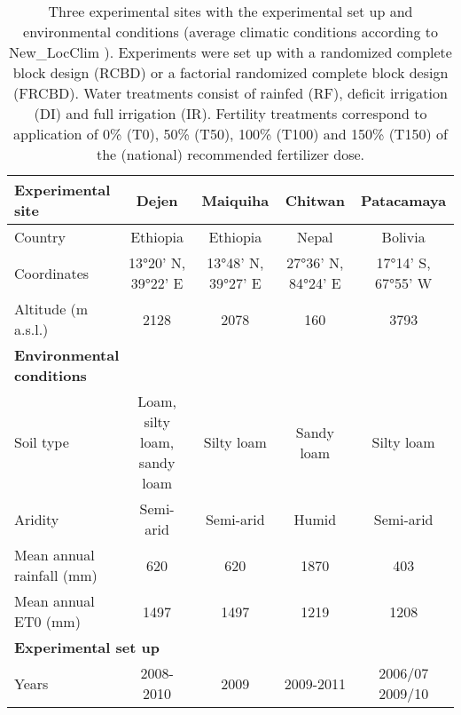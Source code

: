 \begin{landscape}
\begin{table}[htbp]
  	\caption{Three experimental sites with the experimental set up and environmental conditions (average climatic 	conditions according to New\_LocClim \parencite{fao2005}). Experiments were set up with a randomized complete block design (RCBD) or a factorial randomized complete block design (FRCBD). Water treatments consist of rainfed (RF), deficit irrigation (DI) and full irrigation (IR). Fertility treatments correspond to application of 0\% (T0), 50\% (T50), 100\% (T100) and 150\% (T150) of the (national) recommended fertilizer dose.}
    \resizebox{\linewidth}{!}
		{
	\begin{threeparttable}
  	\centering
		\begin{tabular}{lrrrc}
\toprule
\textbf{Experimental site} & \multicolumn{1}{c}{\textbf{Dejen}} & \multicolumn{1}{c}{\textbf{Maiquiha}} & \multicolumn{1}{c}{\textbf{Chitwan}} & \textbf{Patacamaya} \\
\midrule
Country & \multicolumn{1}{c}{Ethiopia} & \multicolumn{1}{c}{Ethiopia} & \multicolumn{1}{c}{Nepal} & Bolivia \\
Coordinates & \multicolumn{1}{c}{13°20' N, 39°22' E} & \multicolumn{1}{c}{13°48' N, 39°27' E} & \multicolumn{1}{c}{27°36' N, 84°24' E} & 17°14' S, 67°55' W \\
Altitude (m a.s.l.) & \multicolumn{1}{c}{2128} & \multicolumn{1}{c}{2078} & \multicolumn{1}{c}{160} & 3793 \\
\midrule
\multicolumn{2}{l}{\textbf{Environmental conditions}} &       &       &  \\
Soil type & \multicolumn{1}{c}{Loam, silty loam, sandy loam} & \multicolumn{1}{c}{Silty loam} & \multicolumn{1}{c}{Sandy loam} & Silty loam \\
Aridity & \multicolumn{1}{c}{Semi-arid} & \multicolumn{1}{c}{Semi-arid} & \multicolumn{1}{c}{Humid} & Semi-arid \\
Mean annual rainfall (mm) & \multicolumn{1}{c}{620} & \multicolumn{1}{c}{620} & \multicolumn{1}{c}{1870} & 403 \\
Mean annual ET0 (mm) & \multicolumn{1}{c}{1497} & \multicolumn{1}{c}{1497} & \multicolumn{1}{c}{1219} & 1208 \\
\midrule
\multicolumn{2}{l}{\textbf{Experimental set up}} &       &       &  \\
Years & \multicolumn{1}{c}{2008-2010} & \multicolumn{1}{c}{2009} & \multicolumn{1}{c}{2009-2011} & 2006/07 2009/10 \\

\end{tabular}
\end{threeparttable}}
\end{table}
\end{landscape}
